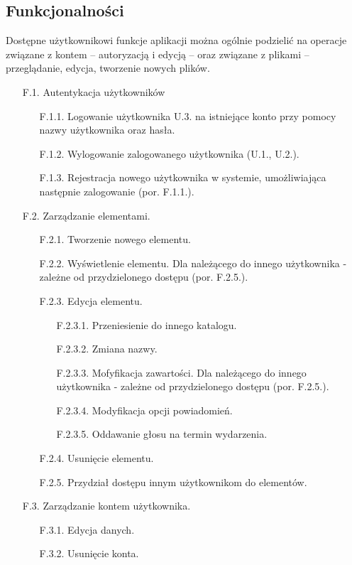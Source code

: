 \documentclass[a4paper,twoside,12pt]{book}
\begin{document}
\subsection{Funkcjonalności}
Dostępne użytkownikowi funkcje aplikacji można ogólnie podzielić na operacje związane z kontem -- autoryzacją i edycją -- oraz związane z plikami -- przeglądanie, edycja, tworzenie nowych plików.
\begin{itemize}
	\item [F.1.] Autentykacja użytkowników
	\begin{itemize}
		\item [F.1.1.] Logowanie użytkownika U.3. na istniejące konto przy pomocy nazwy użytkownika oraz hasła.
		\item [F.1.2.] Wylogowanie zalogowanego użytkownika (U.1., U.2.).
		\item [F.1.3.] Rejestracja nowego użytkownika w systemie, umożliwiająca następnie zalogowanie (por. F.1.1.).
	\end{itemize}
	\item [F.2.] Zarządzanie elementami.
	\begin{itemize}
		\item [F.2.1.] Tworzenie nowego elementu.
		\item [F.2.2.] Wyświetlenie elementu. Dla należącego do innego użytkownika - zależne od przydzielonego dostępu (por. F.2.5.).
		\item [F.2.3.] Edycja elementu.
		\begin{itemize}
			\item [F.2.3.1.] Przeniesienie do innego katalogu.
			\item [F.2.3.2.] Zmiana nazwy.
			\item [F.2.3.3.] Mofyfikacja zawartości. Dla należącego do innego użytkownika - zależne od przydzielonego dostępu (por. F.2.5.).
			\item [F.2.3.4.] Modyfikacja opcji powiadomień.
			\item [F.2.3.5.] Oddawanie głosu na termin wydarzenia.
		\end{itemize}
		\item [F.2.4.] Usunięcie elementu.
		\item [F.2.5.] Przydział dostępu innym użytkownikom do elementów.
	\end{itemize}
	\item [F.3.] Zarządzanie kontem użytkownika.
	\begin{itemize}
		\item [F.3.1.] Edycja danych.
		\item [F.3.2.] Usunięcie konta.

\end{itemize}
\end{itemize}
\end{document}
